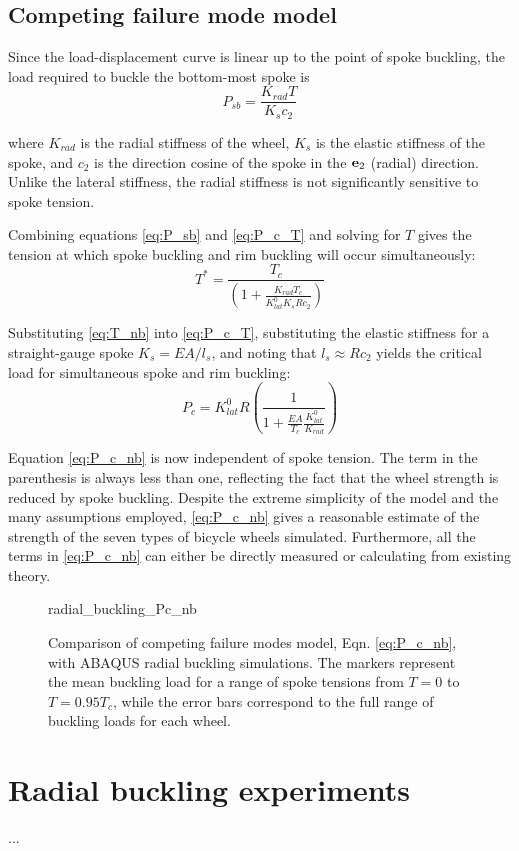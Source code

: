 \documentclass[\rootdir/thesis.tex]{subfiles}
\begin{document}

\subsection{Competing failure mode model}

Since the load-displacement curve is linear up to the point of spoke buckling, the load required to buckle the bottom-most spoke is
\begin{equation}
\label{eq:P_sb}
P_{sb} = \frac{K_{rad}T}{K_s c_2}
\end{equation}

where $K_{rad}$ is the radial stiffness of the wheel, $K_s$ is the elastic stiffness of the spoke, and $c_2$ is the direction cosine of the spoke in the $\mathbf{e}_2$ (radial) direction. Unlike the lateral stiffness, the radial stiffness is not significantly sensitive to spoke tension.

Combining equations \eqref{eq:P_sb} and \eqref{eq:P_c_T} and solving for $T$ gives the tension at which spoke buckling and rim buckling will occur simultaneously:
\begin{equation}
\label{eq:T_nb}
T^* = \frac{T_c}{\left(1 + \frac{K_{rad}T_c}{K_{lat}^0 K_s R c_2}\right)}
\end{equation}

Substituting \eqref{eq:T_nb} into \eqref{eq:P_c_T}, substituting the elastic stiffness for a straight-gauge spoke $K_s=EA/l_s$, and noting that $l_s \approx Rc_2$ yields the critical load for simultaneous spoke and rim buckling:
\begin{equation}
\label{eq:P_c_nb}
P_c = K_{lat}^0 R \left(\frac{1}{1 + \frac{EA}
						{T_c}\frac{K_{lat}^0}{K_{rad}}}\right)
\end{equation}

Equation \eqref{eq:P_c_nb} is now independent of spoke tension. The term in the parenthesis is always less than one, reflecting the fact that the wheel strength is reduced by spoke buckling. Despite the extreme simplicity of the model and the many assumptions employed, \eqref{eq:P_c_nb} gives a reasonable estimate of the strength of the seven types of bicycle wheels simulated. Furthermore, all the terms in \eqref{eq:P_c_nb} can either be directly measured or calculating from existing theory.

\begin{figure}[h]
\centering
{radial_buckling_Pc_nb}
\caption{Comparison of competing failure modes model, Eqn. \eqref{eq:P_c_nb}, with ABAQUS radial buckling simulations. The markers represent the mean buckling load for a range of spoke tensions from $T=0$ to $T=0.95T_c$, while the error bars correspond to the full range of buckling loads for each wheel.}
\end{figure}

\section{Radial buckling experiments}
...
\end{document}
